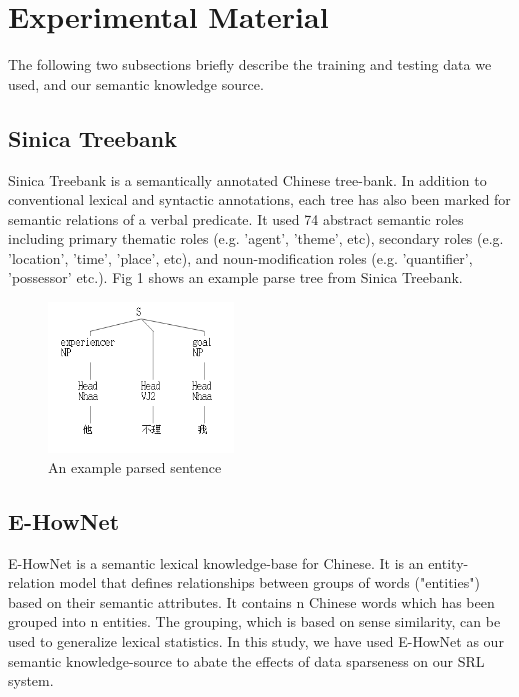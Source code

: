 \documentclass[11pt]{article}
\begin{document}
\section{Experimental Material}
The following two subsections briefly describe the training and testing data we used, and our semantic knowledge source.  
\subsection{Sinica Treebank}
Sinica Treebank \cite{sinica-treebank} is a semantically annotated Chinese tree-bank. In addition to conventional lexical and syntactic annotations, each tree has also been marked for semantic relations of a verbal predicate. It used 74 abstract semantic roles including primary thematic roles (e.g. 'agent', 'theme', etc), secondary roles (e.g. 'location', 'time', 'place', etc), and noun-modification roles (e.g. 'quantifier', 'possessor' etc.). Fig 1 shows an example parse tree from Sinica Treebank.
\begin{figure}[!h]
\centering
\includegraphics[width=.4\textwidth,height=4cm]{./examples/example5.png}
\caption{An example parsed sentence}
\end{figure}
\subsection{E-HowNet}
E-HowNet\cite{keylist} is a semantic lexical knowledge-base for Chinese. It is an entity-relation model that defines relationships between groups of words ("entities") based on their semantic attributes. It contains n Chinese words which has been grouped into n entities. The grouping, which is based on sense similarity, can be used to generalize lexical statistics. In this study, we have used E-HowNet as our semantic knowledge-source to abate the effects of data sparseness on our SRL system.  
\end{document}

